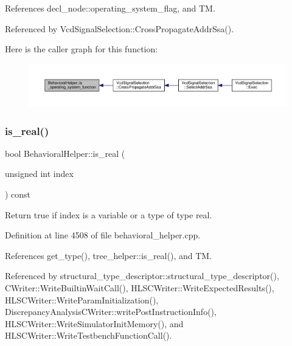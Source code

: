 References decl\+\_\+node\+::operating\+\_\+system\+\_\+flag, and TM.



Referenced by Vcd\+Signal\+Selection\+::\+Cross\+Propagate\+Addr\+Ssa().

Here is the caller graph for this function\+:
\nopagebreak
\begin{figure}[H]
\begin{center}
\leavevmode
\includegraphics[width=350pt]{dd/db2/classBehavioralHelper_a07a49444e63eee25cda5f42f273d1b25_icgraph}
\end{center}
\end{figure}
\mbox{\label{classBehavioralHelper_a33f288afc86fcde819e290640fce8843}} 
\subsubsection{\texorpdfstring{is\+\_\+real()}{is\_real()}}
{\footnotesize\ttfamily bool Behavioral\+Helper\+::is\+\_\+real (\begin{DoxyParamCaption}\item[{unsigned int}]{index }\end{DoxyParamCaption}) const\hspace{0.3cm}{\ttfamily [virtual]}}



Return true if index is a variable or a type of type real. 



Definition at line 4508 of file behavioral\+\_\+helper.\+cpp.



References get\+\_\+type(), tree\+\_\+helper\+::is\+\_\+real(), and TM.



Referenced by structural\+\_\+type\+\_\+descriptor\+::structural\+\_\+type\+\_\+descriptor(), C\+Writer\+::\+Write\+Builtin\+Wait\+Call(), H\+L\+S\+C\+Writer\+::\+Write\+Expected\+Results(), H\+L\+S\+C\+Writer\+::\+Write\+Param\+Initialization(), Discrepancy\+Analysis\+C\+Writer\+::write\+Post\+Instruction\+Info(), H\+L\+S\+C\+Writer\+::\+Write\+Simulator\+Init\+Memory(), and H\+L\+S\+C\+Writer\+::\+Write\+Testbench\+Function\+Call().

